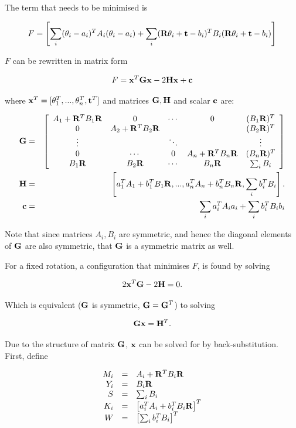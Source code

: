 The term that needs to be minimised is

$$
F = \left[ \sum_i (\theta_i - a_i)^T A_i (\theta_i - a_i) +
\sum_i ({\bf R}\theta_i + {\bf t} - b_i)^T B_i ({\bf R}\theta_i + {\bf t} - b_i)
\right]
$$

$F$ can be rewritten in matrix form

$$
F =  {\bf x}^T{\bf Gx} -2{\bf Hx} + {\bf c}
$$

where ${\bf x}^T = [\theta_1^T,...,\theta_n^T, {\bf t}^T]$ and
matrices ${\bf G},{\bf H}$ and scalar ${\bf c}$ are:

\begin{eqnarray}
{\bf G} &=& \left[ \begin{array}{ccccc}
A_1 + {\bf R}^TB_1{\bf R}&
0&\cdots&0&
(B_1{\bf R})^T\\
0&A_2 + {\bf R}^TB_2{\bf R}&&&(B_2{\bf R})^T\\
\vdots & & \ddots & & \vdots\\
0&\cdots&0&
A_n + {\bf R}^TB_n{\bf R}&
(B_n{\bf R})^T\\
B_1{\bf R}&B_2{\bf R}&\cdots&
B_n{\bf R}&
\sum_i B_i
\end{array} \right]\\
{\bf H}  &=& \left[a_1^TA_1+b_1^TB_1{\bf  R},...,
a_n^TA_n+b_n^TB_n{\bf R},
\sum_i b_i^TB_i
 \right].\\
{\bf c} &=& \sum_i a_i^TA_ia_i + \sum_i b_i^TB_ib_i
\end{eqnarray}

Note that since matrices $A_i,B_i$ are symmetric, and hence the
diagonal elements of ${\bf G}$ are also symmetric, that ${\bf G}$
is a symmetric matrix as well. 


For a fixed rotation, a configuration that
minimises $F$, is found by solving

$$
2{\bf x}^T{\bf G} - 2{\bf H} = 0.
$$

Which is equivalent (${\bf G}$ is symmetric, ${\bf G} = {\bf G}^T$) to
solving

$$
 {\bf Gx} = {\bf H}^T.
$$

Due to the structure of matrix ${\bf G}$, ${\bf x}$ can be solved for
by back-substitution. First, define

\begin{equation}
\begin{array}{rcl}
M_i &=& A_i + {\bf R}^TB_i{\bf R}\\
Y_i &=& B_i{\bf R}\\
S   &=& \sum_i B_i \\
K_i &=& \left[a_i^TA_i + b_i^TB_i{\bf R}\right]^T\\
W   &=& \left[ \sum_i b_i^TB_i \right]^T
\end{array}
\end{equation}

